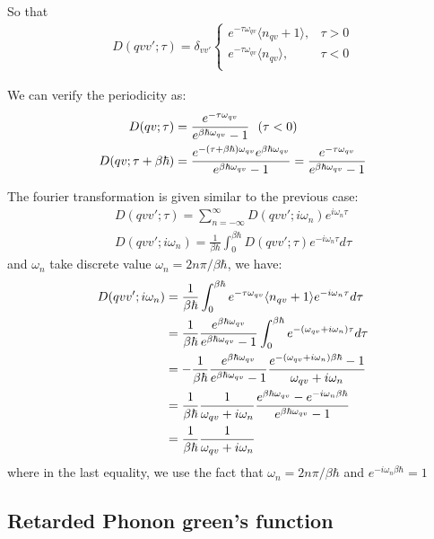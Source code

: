 \documentclass{article}
\begin{document}
So that 
\begin{align}
    D(qvv';\tau) = \delta_{vv'}
    \begin{cases}
        e^{-\tau\omega_{qv}} \langle n_{qv} + 1 \rangle, &\tau > 0 \\
        e^{-\tau\omega_{qv}} \langle n_{qv} \rangle , &\tau < 0 \\
    \end{cases}
\end{align}

We can verify the periodicity as:
\begin{align}
    D(qv;\tau) &= \frac{e^{-\tau\omega_{qv}}}{e^{\beta\hbar\omega_{qv}}- 1} \ \ (\tau < 0) \notag \\
    D(qv;\tau+\beta\hbar) &= \frac{e^{-(\tau+\beta\hbar)\omega_{qv}} e^{\beta\hbar\omega_{qv}}}{e^{\beta\hbar\omega_{qv}}- 1} 
                         = \frac{e^{-\tau\omega_{qv}}}{e^{\beta\hbar\omega_{qv}}- 1} \notag
\end{align}

The fourier transformation is given similar to the previous case:
\begin{gather}
        D(qvv';\tau) = \sum_{n = - \infty}^{\infty} D(qvv';i\omega_n) e^{i\omega_n\tau} \\
        D(qvv';i\omega_n) = \frac{1}{\beta\hbar} \int_{0}^{\beta\hbar} D(qvv';\tau) e^{-i\omega_n\tau} d\tau
\end{gather}
and $\omega_n$ take discrete value $\omega_n = 2n\pi/\beta\hbar$, we have:
\begin{align}
    D(qvv';i\omega_n) &= \frac{1}{\beta\hbar} \int_{0}^{\beta\hbar} e^{-\tau\omega_{qv}} \langle n_{qv} + 1 \rangle e^{-i\omega_n\tau} d\tau \notag \\
                    &= \frac{1}{\beta\hbar} \frac{e^{\beta\hbar\omega_{qv}}}{e^{\beta\hbar\omega_{qv}}- 1} \int_0^{\beta\hbar} e^{-(\omega_{qv} + i\omega_n)\tau} d\tau \notag \\
                    &= - \frac{1}{\beta\hbar} \frac{e^{\beta\hbar\omega_{qv}}}{e^{\beta\hbar\omega_{qv}}- 1} \frac{e^{-(\omega_{qv} + i\omega_n)\beta\hbar} - 1}{\omega_{qv} + i\omega_n} \notag \\
                    &= \frac{1}{\beta\hbar} \frac{1}{\omega_{qv} + i\omega_n}\frac{e^{\beta\hbar\omega_{qv}}- e^{-i\omega_n \beta\hbar}}{e^{\beta\hbar\omega_{qv}}- 1}  \notag \\
                    &= \frac{1}{\beta\hbar} \frac{1}{\omega_{qv} + i\omega_n}
\end{align}
where in the last equality, we use the fact that $\omega_n = 2n\pi/\beta\hbar$ and $e^{-i\omega_n \beta\hbar} = 1$

\subsection*{Retarded Phonon green's function}
\end{document}
